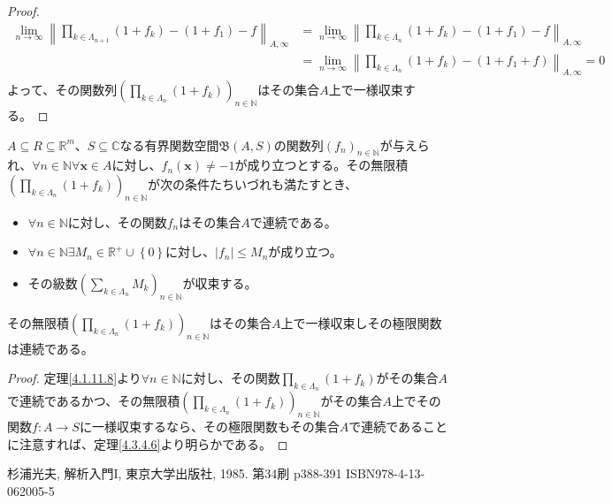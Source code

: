 \documentclass[dvipdfmx]{jsarticle}
\begin{document}
\begin{proof}
\begin{align*}
\lim_{n \rightarrow \infty}\left\| \prod_{k \in \varLambda_{n + 1}} \left( 1 + f_{k} \right) - \left( 1 + f_{1} \right) - f \right\|_{A,\infty} &= \lim_{n \rightarrow \infty}\left\| \prod_{k \in \varLambda_{n}} \left( 1 + f_{k} \right) - \left( 1 + f_{1} \right) - f \right\|_{A,\infty}\\
&= \lim_{n \rightarrow \infty}\left\| \prod_{k \in \varLambda_{n}} \left( 1 + f_{k} \right) - \left( 1 + f_{1} + f \right) \right\|_{A,\infty} = 0
\end{align*}
よって、その関数列$\left( \prod_{k \in \varLambda_{n}} \left( 1 + f_{k} \right) \right)_{n \in \mathbb{N}}$はその集合$A$上で一様収束する。
\end{proof}
\begin{thm}\label{4.3.4.7}
$A \subseteq R \subseteq \mathbb{R}^{m}$、$S \subseteq \mathbb{C}$なる有界関数空間$\mathfrak{B}(A,S)$の関数列$\left( f_{n} \right)_{n \in \mathbb{N}}$が与えられ、$\forall n \in \mathbb{N}\forall\mathbf{x} \in A$に対し、$f_{n}\left( \mathbf{x} \right) \neq - 1$が成り立つとする。その無限積$\left( \prod_{k \in \varLambda_{n}} \left( 1 + f_{k} \right) \right)_{n \in \mathbb{N}}$が次の条件たちいづれも満たすとき、
\begin{itemize}
\item
  $\forall n \in \mathbb{N}$に対し、その関数$f_{n}$はその集合$A$で連続である。
\item
  $\forall n \in \mathbb{N}\exists M_{n} \in \mathbb{R}^{+} \cup \left\{ 0 \right\}$に対し、$\left| f_{n} \right| \leq M_{n}$が成り立つ。
\item
  その級数$\left( \sum_{k \in \varLambda_{n}} M_{k} \right)_{n \in \mathbb{N}}$が収束する。
\end{itemize}
その無限積$\left( \prod_{k \in \varLambda_{n}} \left( 1 + f_{k} \right) \right)_{n \in \mathbb{N}}$はその集合$A$上で一様収束しその極限関数は連続である。
\end{thm}
\begin{proof} 定理\ref{4.1.11.8}より$\forall n \in \mathbb{N}$に対し、その関数$\prod_{k \in \varLambda_{n}} \left( 1 + f_{k} \right)$がその集合$A$で連続であるかつ、その無限積$\left( \prod_{k \in \varLambda_{n}} \left( 1 + f_{k} \right) \right)_{n \in \mathbb{N}}$がその集合$A$上でその関数$f:A \rightarrow S$に一様収束するなら、その極限関数もその集合$A$で連続であることに注意すれば、定理\ref{4.3.4.6}より明らかである。
\end{proof}
\begin{thebibliography}{50}
  杉浦光夫, 解析入門I, 東京大学出版社, 1985. 第34刷 p388-391 ISBN978-4-13-062005-5
\end{thebibliography}
\end{document}
